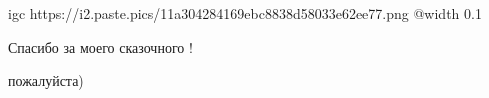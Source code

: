  
 
 
 
 

\qqSecCmt


\ifcmt
  igc https://i2.paste.pics/11a304284169ebc8838d58033e62ee77.png
	@width 0.1
\fi


Спасибо за моего сказочного ! 🙂


пожалуйста)
